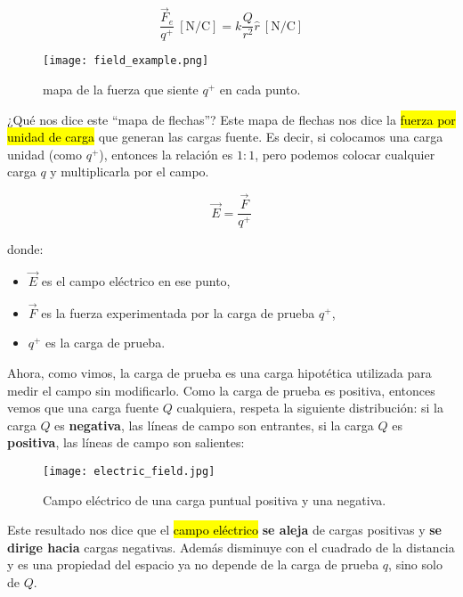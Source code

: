 \[
\frac{\vec{F}_e}{q^{+}} ~ [\si{\newton\per\coulomb}] = k \frac{Q}{r^2} \hat{r} ~ [\si{\newton\per\coulomb}]
\]

\begin{figure}[ht]
    \centering
    \texttt{[image: field\_example.png]}
    \caption{mapa de la fuerza que siente \(q^{+}\) en cada punto.}
    \label{fig:campo_electrico_ejemplo_3}
\end{figure}

¿Qué nos dice este ``mapa de flechas''? Este mapa de flechas nos dice la \hl{fuerza por unidad de carga} que generan las cargas fuente. Es decir, si colocamos una carga unidad (como \(q^{+}\)), entonces la relación es \(1:1\), pero podemos colocar cualquier carga \(q\) y multiplicarla por el campo.

\begin{equation}
    \vec{E} = \frac{\vec{F}}{q^{+}}
    \label{eq:campo_electrico}
\end{equation}

donde:
\begin{itemize}
    \item \( \vec{E} \) es el campo eléctrico en ese punto,
    \item \( \vec{F} \) es la fuerza experimentada por la carga de prueba \( q^{+} \),
    \item \( q^{+} \) es la carga de prueba.
\end{itemize}

Ahora, como vimos, la carga de prueba es una carga hipotética utilizada para medir el campo sin modificarlo. Como la carga de prueba es positiva, entonces vemos que una carga fuente \(Q\) cualquiera, respeta la siguiente distribución: si la carga \(Q\) es \textbf{negativa}, las líneas de campo son entrantes, si la carga \(Q\) es \textbf{positiva}, las líneas de campo son salientes:

\begin{figure}[ht]
    \centering
    \texttt{[image: electric\_field.jpg]}
    \caption{Campo eléctrico de una carga puntual positiva y una negativa.}
    \label{fig:campo_electrico}
\end{figure}

Este resultado nos dice que el \hl{campo eléctrico} \textbf{se aleja} de cargas positivas y \textbf{se dirige hacia} cargas negativas. Además disminuye con el cuadrado de la distancia y es una propiedad del espacio ya no depende de la carga de prueba \( q \), sino solo de \( Q \).

